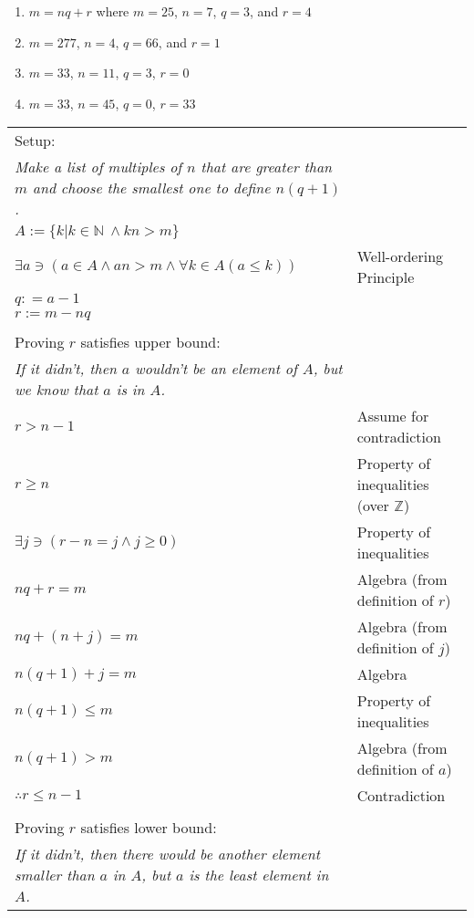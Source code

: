 \item
\begin{enumerate}
\item $m = nq + r$ where $m = 25$, $n = 7$, $q = 3$, and $r = 4$
\item $m = 277$, $n = 4$, $q = 66$, and $r = 1$
\item $m = 33$, $n = 11$, $q = 3$, $r = 0$
\item $m = 33$, $n = 45$, $q = 0$, $r = 33$
\end{enumerate}

\item
\begin{tabular}[t]{p{4 in} l}
Setup: \\
\textit{Make a list of multiples of $n$ that are greater than $m$ and choose the smallest one to define $n(q + 1)$.} \\
$A := \{k | k \in \mathbb{N}\ \wedge kn > m \}$ &  \\
$\exists a \ni (a \in A \wedge an > m \wedge \forall k \in A (a \leq k))$ & Well-ordering Principle \\
$q : = a - 1 $ &  \\
$r := m - nq$ &  \\
\\
Proving $r$ satisfies upper bound: \\
\textit{If it didn't, then $a$ wouldn't be an element of $A$, but we know that $a$ is in $A$.} \\
$r > n - 1$ & Assume for contradiction \\
$r \geq n$ & Property of inequalities (over $\mathbb{Z}$) \\
$\exists j \ni (r - n = j \wedge j \geq 0)$ & Property of inequalities \\
$nq + r = m $ & Algebra (from definition of $r$) \\
$nq + (n + j) = m$ & Algebra (from definition of $j$)\\
$n(q + 1) + j = m$ & Algebra \\
$n(q + 1) \leq m$ & Property of inequalities \\
$n(q + 1) > m$ & Algebra (from definition of $a$) \\
$\therefore r \leq n - 1$ & Contradiction \\
\\
Proving $r$ satisfies lower bound: \\
\textit{If it didn't, then there would be another element smaller than $a$ in $A$, but $a$ is the least element in $A$.} \\

\end{tabular}

